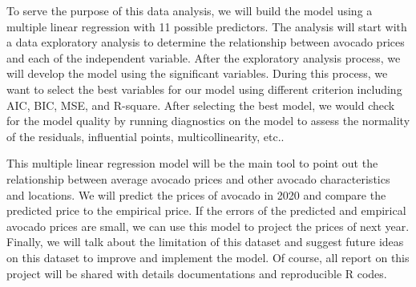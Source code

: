 \documentclass[11pt]{article}
\begin{document}
To serve the purpose of this data analysis, we will build the model using a multiple linear regression with 11 possible predictors. The analysis will start with a data exploratory analysis to determine the relationship between avocado prices and each of the independent variable. After the exploratory analysis process, we will develop the model using the significant variables. During this process, we want to select the best variables for our model using different criterion including AIC, BIC, MSE, and R-square. After selecting the best model, we would check for the model quality by running diagnostics on the model to assess the normality of the residuals, influential points, multicollinearity, etc..

\vspace{0.5cm}

This multiple linear regression model will be the main tool to point out the relationship between average avocado prices and other avocado characteristics and locations. We will predict the prices of avocado in 2020 and compare the predicted price to the empirical price. If the errors of the predicted and empirical avocado prices are small, we can use this model to project the prices of next year. Finally, we will talk about the limitation of this dataset and suggest future ideas on this dataset to improve and implement the model.  Of course, all report on this project will be shared with details documentations and reproducible R codes.
\end{document}
